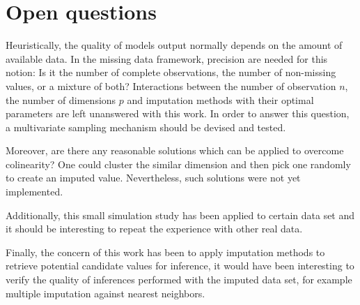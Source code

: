 \section{Open questions}

Heuristically, the quality of models output normally depends on the amount of
available data. In the missing data framework, precision are needed for this
notion: Is it the number of complete observations, the number of non-missing
values, or a mixture of both?  Interactions between the number of observation
$n$, the number of dimensions $p$ and imputation methods with their optimal
parameters are left unanswered with this work. In order to answer this
question, a multivariate sampling mechanism should be devised and tested.

Moreover, are there any reasonable solutions which can be applied to overcome
colinearity? One could cluster the similar dimension and then pick one randomly
to create an imputed value. Nevertheless, such solutions were not yet
implemented.

Additionally, this small simulation study has been applied to certain data set
and it should be interesting to repeat the experience with other real data.

Finally, the concern of this work has been to apply imputation methods to
retrieve potential candidate values for inference, it would have been
interesting to verify the quality of inferences performed with the imputed data
set, for example multiple imputation against nearest neighbors.

